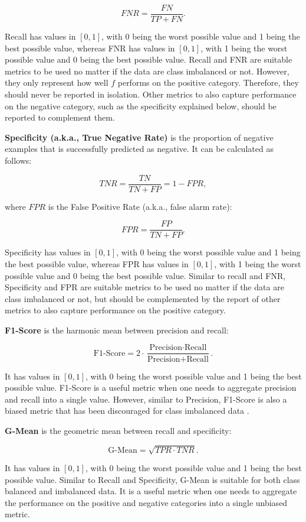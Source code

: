\[FNR = \frac{FN}{TP+FN}. \]

\noindent Recall has values in $[0,1]$, with 0 being the worst possible value and 1 being the best possible value, whereas FNR has values in $[0,1]$, with 1 being the worst possible value and 0 being the best possible value. Recall and FNR are suitable metrics to be used no matter if the data are class imbalanced or not. However, they only represent how well $f$ performs on the positive category. Therefore, they should never be reported in isolation. Other metrics to also capture performance on the negative category, such as the specificity explained below, should be reported to complement them.

\textbf{Specificity (a.k.a., True Negative Rate)}  is the proportion of negative examples that is successfully predicted as negative.  It can be calculated as follows:

\[TNR = \frac{TN}{TN+FP} = 1 - FPR, \]

\noindent where $FPR$ is the False Positive Rate (a.k.a., false alarm rate):

\[FPR = \frac{FP}{TN+FP}. \]

\noindent Specificity has values in $[0,1]$, with 0 being the worst possible value and 1 being the best possible value, whereas FPR has values in $[0,1]$, with 1 being the worst possible value and 0 being the best possible value. Similar to recall and FNR, Specificity and FPR are suitable metrics to be used no matter if the data are class imbalanced or not, but should be complemented by the report of other metrics to also capture performance on the positive category. 

\textbf{F1-Score} is the harmonic mean between precision and recall:

\[ \text{F1-Score} = 2 \cdot \frac{\text{Precision} \cdot \text{Recall}}{\text{Precision} + \text{Recall}}. \]

\noindent It has values in  $[0,1]$, with 0 being the worst possible value and 1 being the best possible value. F1-Score is a useful metric when one needs to aggregate precision and recall into a single value. However, similar to Precision, F1-Score is also a biased metric that has been discouraged for class imbalanced data \cite{LuqueEtAl2019}.

\textbf{G-Mean} is the geometric mean between recall and specificity:

\[\text{G-Mean} = \sqrt{TPR \cdot TNR}.\]

\noindent It has values in  $[0,1]$, with 0 being the worst possible value and 1 being the best possible value.  Similar to Recall and Specificity, G-Mean is suitable for both class balanced and imbalanced data. It is a useful metric when one needs to aggregate the performance on the positive and negative categories into a single unbiased metric.



